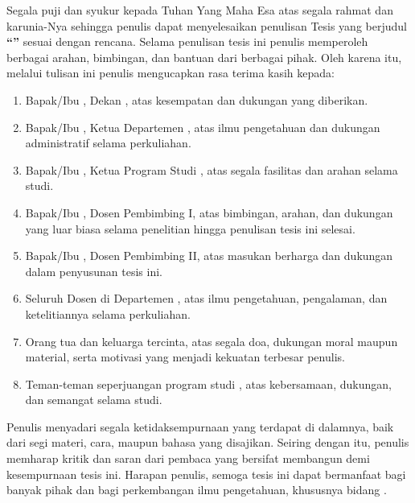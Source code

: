 %
\preface %

Segala puji dan syukur kepada Tuhan Yang Maha Esa atas segala rahmat dan
karunia-Nya sehingga penulis dapat menyelesaikan penulisan Tesis yang berjudul
\textbf{``\MakeUppercase{\judul}''} sesuai dengan rencana. Selama penulisan
tesis ini penulis memperoleh berbagai arahan, bimbingan, dan bantuan dari
berbagai pihak. Oleh karena itu, melalui tulisan ini penulis mengucapkan rasa
terima kasih kepada:

\begin{enumerate}\setlength{\itemsep}{0pt}
    \item{Bapak/Ibu \dekan, Dekan \faculty{} \university, atas kesempatan dan dukungan yang diberikan.}
    \item{Bapak/Ibu \kajur, Ketua Departemen \dept, atas ilmu pengetahuan dan dukungan administratif selama perkuliahan.}
    \item{Bapak/Ibu \kaprodi, Ketua Program Studi \programstudi, atas segala fasilitas dan arahan selama studi.}
    \item{Bapak/Ibu \firstsupervisor, Dosen Pembimbing I, atas bimbingan, arahan, dan dukungan yang luar biasa selama penelitian hingga penulisan tesis ini selesai.}
    \item{Bapak/Ibu \secondsupervisor, Dosen Pembimbing II, atas masukan berharga dan dukungan dalam penyusunan tesis ini.}
    \item{Seluruh Dosen di Departemen \dept{} \faculty, atas ilmu pengetahuan, pengalaman, dan ketelitiannya selama perkuliahan.}
    \item{Orang tua dan keluarga tercinta, atas segala doa, dukungan moral maupun material, serta motivasi yang menjadi kekuatan terbesar penulis.}
    \item{Teman-teman seperjuangan program studi \programstudi, atas kebersamaan, dukungan, dan semangat selama studi.}
\end{enumerate}

\vspace{0.2cm}

Penulis menyadari segala ketidaksempurnaan yang terdapat di dalamnya, baik dari
segi materi, cara, maupun bahasa yang disajikan. Seiring dengan itu, penulis
memharap kritik dan saran dari pembaca yang bersifat membangun demi
kesempurnaan tesis ini. Harapan penulis, semoga tesis ini dapat bermanfaat bagi
banyak pihak dan bagi perkembangan ilmu pengetahuan, khususnya bidang
\programstudi.

